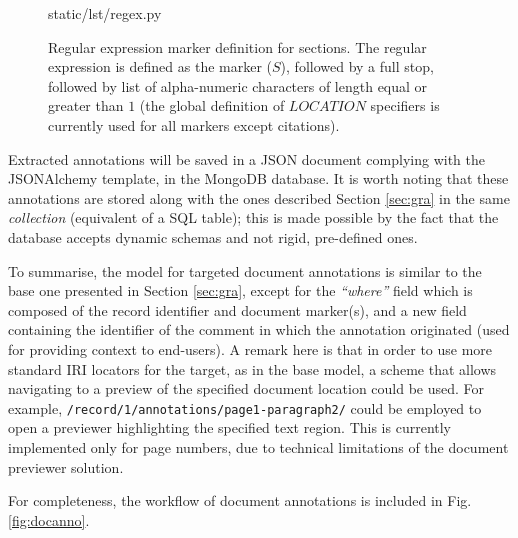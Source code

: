 \begin{figure}[!ht]
  
    {static/lst/regex.py}
    \caption[Regular expression marker definition for sections]
            {Regular expression marker definition for sections. The regular
             expression is defined as the marker ($S$), followed by a full stop,
             followed by list of alpha-numeric characters of length equal or
             greater than $1$ (the global definition of $LOCATION$ specifiers
             is currently used for all markers except citations).}
    \label{lst:regex}
\end{figure}

\newpage

Extracted annotations will be saved in a JSON document complying with the
JSONAlchemy template, in the MongoDB database. It is worth noting that these
annotations are stored along with the ones described Section \ref{sec:gra}
in the same \textit{collection} (equivalent of a SQL table); this is made
possible by the fact that the database accepts dynamic schemas and not rigid,
pre-defined ones.

To summarise, the model for targeted document annotations is similar to the
base one presented in Section \ref{sec:gra}, except for the \textit{``where''}
field which is composed of the record identifier and document marker(s), and a
new field containing the identifier of the comment in which the annotation
originated (used for providing context to end-users). A remark here is that in
order to use more standard IRI locators for the target, as in the base model, a
scheme that allows navigating to a preview of the specified document location
could be used.  For example, \texttt{/record/1/annotations/page1-paragraph2/}
could be employed to open a previewer highlighting the specified text region.
This is currently implemented only for page numbers, due to technical
limitations of the document previewer solution.

For completeness, the workflow of document annotations is included in Fig.
\ref{fig:docanno}.

